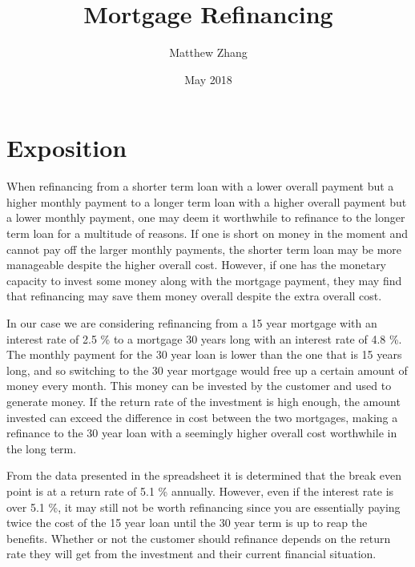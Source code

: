 \documentclass{article}
\title{Mortgage Refinancing}
\author{Matthew Zhang}
\date{May 2018}
\begin{document}
\maketitle

\section{Exposition}

\quad When refinancing from a shorter term loan with a lower overall payment but a higher monthly payment to a longer term loan with a higher overall payment but a lower monthly payment, one may deem it worthwhile to refinance to the longer term loan for a multitude of reasons. If one is short on money in the moment and cannot pay off the larger monthly payments, the shorter term loan may be more manageable despite the higher overall cost. However, if one has the monetary capacity to invest some money along with the mortgage payment, they may find that refinancing may save them money overall despite the extra overall cost. 

In our case we are considering refinancing from a 15 year mortgage with an interest rate of 2.5 \% to a mortgage 30 years long with an interest rate of 4.8 \%. The monthly payment for the 30 year loan is lower than the one that is 15 years long, and so switching to the 30 year mortgage would free up a certain amount of money every month. This money can be invested by the customer and used to generate money. If the return rate of the investment is high enough, the amount invested can exceed the difference in cost between the two mortgages, making a refinance to the 30 year loan with a seemingly higher overall cost worthwhile in the long term.

From the data presented in the spreadsheet it is determined that the break even point is at a return rate of 5.1 \% annually. However, even if the interest rate is over 5.1 \%, it may still not be worth refinancing since you are essentially paying twice the cost of the 15  year loan until the 30 year term is up to reap the benefits. Whether or not the customer should refinance depends on the return rate they will get from the investment and their current financial situation.
\end{document}
